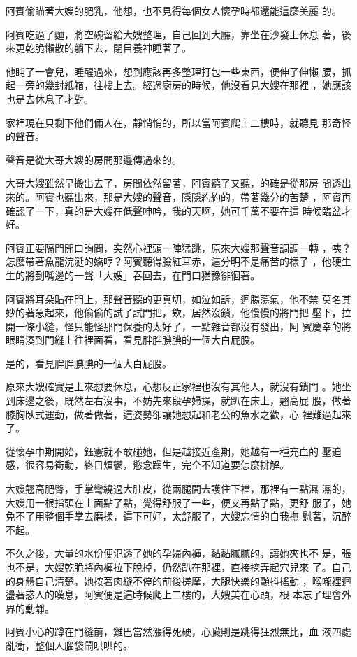 阿賓偷瞄著大嫂的肥乳，他想，也不見得每個女人懷孕時都還能這麼美麗
的。

阿賓吃過了麵，將空碗留給大嫂整理，自己回到大廳，靠坐在沙發上休息
著，後來更乾脆懶散的躺下去，閉目養神睡著了。

他盹了一會兒，睡醒過來，想到應該再多整理打包一些東西，便伸了伸懶
腰，抓起一旁的幾封紙箱，往樓上去。經過廚房的時候，他沒看見大嫂在那裡
，她應該也是去休息了才對。

家裡現在只剩下他們倆人在，靜悄悄的，所以當阿賓爬上二樓時，就聽見
那奇怪的聲音。

聲音是從大哥大嫂的房間那邊傳過來的。

大哥大嫂雖然早搬出去了，房間依然留著，阿賓聽了又聽，的確是從那房
間透出來的。阿賓也聽出來，那是大嫂的聲音，隱隱約約的，帶著幾分的苦楚
，阿賓再確認了一下，真的是大嫂在低聲呻吟，我的天啊，她可千萬不要在這
時候臨盆才好。

阿賓正要隔門開口詢問，突然心裡頭一陣猛跳，原來大嫂那聲音調調一轉
，咦？怎麼帶著魚龍浣涎的嬌哼？阿賓聽得臉紅耳赤，這分明不是痛苦的樣子
，他硬生生的將到嘴邊的一聲「大嫂」吞回去，在門口猶豫徘徊著。

阿賓將耳朵貼在門上，那聲音聽的更真切，如泣如訴，迴腸蕩氣，他不禁
莫名其妙的著急起來，他偷偷的試了試門把，欸，居然沒鎖，他慢慢的將門把
壓下，拉開一條小縫，怪只能怪那門保養的太好了，一點雜音都沒有發出，阿
賓慶幸的將眼睛湊到門縫上往裡面看，看見胖胖腆腆的一個大白屁股。

是的，看見胖胖腆腆的一個大白屁股。

原來大嫂確實是上來想要休息，心想反正家裡也沒有其他人，就沒有鎖門
。她坐到床邊之後，既然左右沒事，不妨先來段孕婦操，就趴在床上，翹高屁
股，做著膝胸臥式運動，做著做著，這姿勢卻讓她想起和老公的魚水之歡，心
裡難過起來了。

從懷孕中期開始，鈺憲就不敢碰她，但是越接近產期，她越有一種充血的
壓迫感，很容易衝動，終日煩鬱，慾念躁生，完全不知道要怎麼排解。

大嫂翹高肥臀，手掌彎繞過大肚皮，從兩腿間去護住下襠，那裡有一點濕
濕的，大嫂用一根指頭在上面點了點，覺得舒服了一些，便又再點了點，更舒
服了，她免不了用整個手掌去磨揉，這下可好，太舒服了，大嫂忘情的自我撫
慰著，沉醉不起。

不久之後，大量的水份便氾透了她的孕婦內褲，黏黏膩膩的，讓她夾也不
是，張也不是，大嫂乾脆將內褲拉下脫掉，仍然趴在那裡，直接挖弄起穴兒來
了。自己的身體自己清楚，她按著肉縫不停的前後搓摩，大腿快樂的顫抖搖動
，喉嚨裡迴盪著惑人的嘆息，阿賓便是這時候爬上二樓的，大嫂美在心頭，根
本忘了理會外界的動靜。

阿賓小心的蹲在門縫前，雞巴當然漲得死硬，心臟則是跳得狂烈無比，血
液四處亂衝，整個人腦袋鬧哄哄的。

